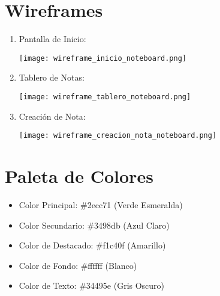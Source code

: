 \section*{Wireframes}
\begin{enumerate}
  \item Pantalla de Inicio:
  \begin{center}
    \texttt{[image: wireframe\_inicio\_noteboard.png]}
  \end{center}
  
  \item Tablero de Notas:
  \begin{center}
    \texttt{[image: wireframe\_tablero\_noteboard.png]}
  \end{center}
  
  \item Creación de Nota:
  \begin{center}
    \texttt{[image: wireframe\_creacion\_nota\_noteboard.png]}
  \end{center}
\end{enumerate}

\section*{Paleta de Colores}
\begin{itemize}
  \item Color Principal: \#2ecc71 (Verde Esmeralda)
  \item Color Secundario: \#3498db (Azul Claro)
  \item Color de Destacado: \#f1c40f (Amarillo)
  \item Color de Fondo: \#ffffff (Blanco)
  \item Color de Texto: \#34495e (Gris Oscuro)
\end{itemize}